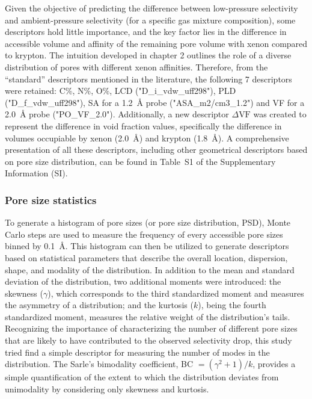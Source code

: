 \documentclass[main]{subfiles}
\begin{document}
Given the objective of predicting the difference between low-pressure selectivity and ambient-pressure selectivity (for a specific gas mixture composition), some descriptors hold little importance, and the key factor lies in the difference in accessible volume and affinity of the remaining pore volume with xenon compared to krypton. The intuition developed in chapter 2 outlines the role of a diverse distribution of pores with different xenon affinities. Therefore, from the ``standard'' descriptors mentioned in the literature, the following 7 descriptors were retained: C\%, N\%, O\%, LCD ("D\_i\_vdw\_uff298"), PLD ("D\_f\_vdw\_uff298"), SA for a \SI{1.2}{\angstrom} probe ("ASA\_m2/cm3\_1.2") and VF for a \SI{2.0}{\angstrom} probe ("PO\_VF\_2.0"). Additionally, a new descriptor $\Delta \text{VF}$ was created to represent the difference in void fraction values, specifically the difference in volumes occupiable by xenon (\SI{2.0}{\angstrom}) and krypton (\SI{1.8}{\angstrom}). A comprehensive presentation of all these descriptors, including other geometrical descriptors based on pore size distribution, can be found in Table~S1 of the Supplementary Information (SI).

\subsubsection{Pore size statistics}

To generate a histogram of pore sizes (or pore size distribution, PSD), Monte Carlo steps are used to measure the frequency of every accessible pore sizes binned by \SI{0.1}{\angstrom}.\autocite{poresize_Pinheiro2013} This histogram can then be utilized to generate descriptors based on statistical parameters that describe the overall location, dispersion, shape, and modality of the distribution. In addition to the mean and standard deviation of the distribution, two additional moments were introduced: the skewness ($\gamma$), which corresponds to the third standardized moment and measures the asymmetry of a distribution; and the kurtosis ($k$), being the fourth standardized moment, measures the relative weight of the distribution's tails. Recognizing the importance of characterizing the number of different pore sizes that are likely to have contributed to the observed selectivity drop, this study tried find a simple descriptor for measuring the number of modes in the distribution. The Sarle's bimodality coefficient, BC $= (\gamma^2 +1)/k$, provides a simple quantification of the extent to which the distribution deviates from unimodality by considering only skewness and kurtosis\autocite{Tarba_2022}.
\end{document}
